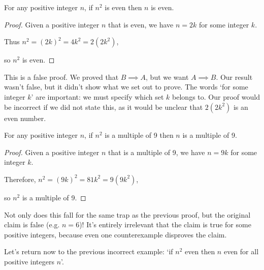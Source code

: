 \begin{claim}
	For any positive integer \(n\), if \(n^2\) is even then \(n\) is even.
\end{claim}
\begin{proof}
	Given a positive integer \(n\) that is even, we have \(n=2k\) for some integer \(k\).

	Thus \(n^2 = (2k)^2 = 4k^2 = 2(2k^2)\),

	so \(n^2\) is even.
\end{proof}
\begin{note}
	This is a false proof.
	We proved that \(B \implies A\), but we want \(A \implies B\).
	Our result wasn't false, but it didn't show what we set out to prove.
	The words `for some integer \(k\)' are important: we must specify which set \(k\) belongs to.
	Our proof would be incorrect if we did not state this, as it would be unclear that \(2(2k^2)\) is an even number.
\end{note}

\begin{claim}
	For any positive integer \(n\), if \(n^2\) is a multiple of 9 then \(n\) is a multiple of 9.
\end{claim}
\begin{proof}
	Given a positive integer \(n\) that is a multiple of 9, we have \(n=9k\) for some integer \(k\).

	Therefore, \(n^2 = (9k)^2 = 81k^2 = 9(9k^2)\),

	so \(n^2\) is a multiple of 9.
\end{proof}
\begin{note}
	Not only does this fall for the same trap as the previous proof, but the original claim is false (e.g.
	\(n=6\))!
	It's entirely irrelevant that the claim is true for some positive integers, because even one counterexample disproves the claim.
\end{note}

Let's return now to the previous incorrect example: `if \(n^2\) even then \(n\) even for all positive integers \(n\)'.


